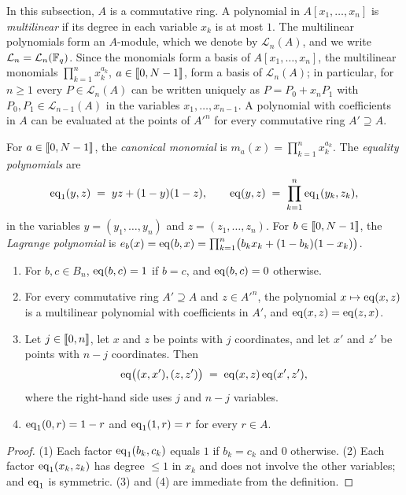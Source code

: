 In this subsection, $A$ is a commutative ring.
A polynomial in $A[x_1,\dots,x_n]$ is \emph{multilinear} if its degree in each variable $x_k$ is at most $1$.
The multilinear polynomials form an $A$-module, which we denote by $\mathcal{L}_n(A)$, and we write $\mathcal{L}_n = \mathcal{L}_n(\mathbb{F}_q)$.
Since the monomials form a basis of $A[x_1,\dots,x_n]$, the multilinear monomials $\prod_{k=1}^n x_k^{a_k}$, $a \in \llbracket 0, N-1 \rrbracket$, form a basis of $\mathcal{L}_n(A)$; in particular, for $n \ge 1$ every $P \in \mathcal{L}_n(A)$ can be written uniquely as $P = P_0 + x_n P_1$ with $P_0, P_1 \in \mathcal{L}_{n-1}(A)$ in the variables $x_1,\dots,x_{n-1}$.
A polynomial with coefficients in $A$ can be evaluated at the points of $A'^n$ for every commutative ring $A' \supseteq A$.

\begin{definition}\label{def:bases}
For $a \in \llbracket 0, N-1 \rrbracket$, the \emph{canonical monomial} is
$m_a(x) = \prod_{k=1}^{n} x_k^{a_k}$.
The \emph{equality polynomials} are
\[
  \mathrm{eq}_1(y,z) \;=\; yz + (1-y)(1-z),
  \qquad
  \mathrm{eq}(y,z) \;=\; \prod_{k=1}^{n} \mathrm{eq}_1(y_k,z_k),
\]
in the variables $y = (y_1,\dots,y_n)$ and $z = (z_1,\dots,z_n)$.
For $b \in \llbracket 0, N-1 \rrbracket$, the \emph{Lagrange polynomial} is $e_b(x) = \mathrm{eq}(b, x) = \prod_{k=1}^{n} \bigl( b_k x_k + (1-b_k)(1-x_k) \bigr)$.
\end{definition}

\begin{lemma}\label{lem:eq}
\begin{enumerate}
  \item For $b, c \in B_n$, $\mathrm{eq}(b,c) = 1$ if $b = c$, and $\mathrm{eq}(b,c) = 0$ otherwise.
  \item For every commutative ring $A' \supseteq A$ and $z \in A'^n$, the polynomial $x \mapsto \mathrm{eq}(x, z)$ is a multilinear polynomial with coefficients in $A'$, and $\mathrm{eq}(x,z) = \mathrm{eq}(z,x)$.
  \item Let $j \in \llbracket 0, n \rrbracket$, let $x$ and $z$ be points with $j$ coordinates, and let $x'$ and $z'$ be points with $n-j$ coordinates. Then
  \[
    \mathrm{eq}\bigl((x,x'),(z,z')\bigr) \;=\; \mathrm{eq}(x,z)\,\mathrm{eq}(x',z'),
  \]
  where the right-hand side uses $j$ and $n-j$ variables.
  \item $\mathrm{eq}_1(0, r) = 1 - r$ and $\mathrm{eq}_1(1, r) = r$ for every $r \in A$.
\end{enumerate}
\end{lemma}

\begin{proof}
(1) Each factor $\mathrm{eq}_1(b_k,c_k)$ equals $1$ if $b_k = c_k$ and $0$ otherwise.
(2) Each factor $\mathrm{eq}_1(x_k,z_k)$ has degree $\le 1$ in $x_k$ and does not involve the other variables; and $\mathrm{eq}_1$ is symmetric.
(3) and (4) are immediate from the definition.
\end{proof}

